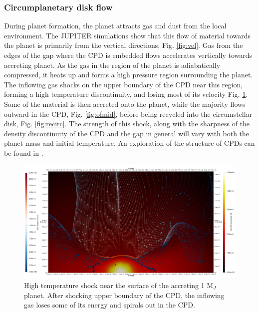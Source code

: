 \documentclass[preprint2]{aastex62}
\begin{document}
\subsubsection{Circumplanetary disk flow}

During planet formation, the planet attracts gas and dust from the local environment. The JUPITER simulations show that this flow of material towards the planet is primarily from the vertical directions, Fig. \ref{fig:vel}. Gas from the edges of the gap where the CPD is embedded flows accelerates vertically towards accreting planet. As the gas in the region of the planet is adiabatically compressed, it heats up and forms a high pressure region surrounding the planet. The inflowing gas shocks on the upper boundary of the CPD near this region, forming a high temperature discontinuity, and losing most of its velocity Fig. \ref{fig:tshock}. Some of the material is then accreted onto the planet, while the majority flows outward in the CPD, Fig. \ref{fig:ofmid}, before being recycled into the circumstellar disk, Fig. \ref{fig:recirc}. The strength of this shock, along with the sharpness of the density discontinuity of the CPD and the gap in general will vary with both the planet mass and initial temperature. An exploration of the structure of CPDs can be found in \cite{Szulagyi2016}.
 
\renewcommand{\topfraction}{1}
\renewcommand{\bottomfraction}{1}

\begin{figure}[htb!]
	\centering
	\includegraphics[width=0.95\linewidth]{figures/Presentation/GasShock.png}
	\caption{\label{fig:tshock} High temperature shock near the surface of the accreting 1 M$_{J}$ planet. After shocking upper boundary of the CPD, the inflowing gas loses some of its energy and spirals out in the CPD.}
\end{figure}
\end{document}
